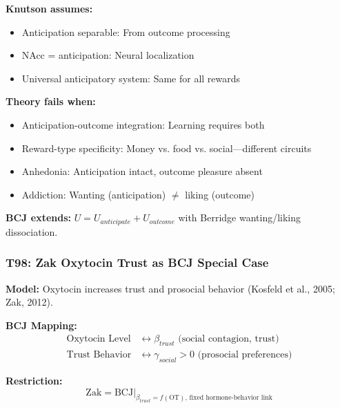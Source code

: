 \begin{tcolorbox}[colback=red!5!white, colframe=red!75!black,
    title=Boundary Condition: Where Knutson Fails]
\textbf{Knutson assumes:}
\begin{itemize}[nosep]
\item Anticipation separable: From outcome processing
\item NAcc = anticipation: Neural localization
\item Universal anticipatory system: Same for all rewards
\end{itemize}

\textbf{Theory fails when:}
\begin{itemize}[nosep]
\item Anticipation-outcome integration: Learning requires both
\item Reward-type specificity: Money vs. food vs. social---different circuits
\item Anhedonia: Anticipation intact, outcome pleasure absent
\item Addiction: Wanting (anticipation) $\neq$ liking (outcome)
\end{itemize}

\textbf{BCJ extends:} $U = U_{anticipate} + U_{outcome}$ with Berridge wanting/liking dissociation.
\end{tcolorbox}

\subsubsection*{T98: Zak Oxytocin Trust as BCJ Special Case}

\textbf{Model:} Oxytocin increases trust and prosocial behavior (Kosfeld et al., 2005; Zak, 2012).

\textbf{BCJ Mapping:}
\begin{align}
\text{Oxytocin Level} &\leftrightarrow \beta_{trust} \text{ (social contagion, trust)} \\
\text{Trust Behavior} &\leftrightarrow \gamma_{social} > 0 \text{ (prosocial preferences)}
\end{align}

\textbf{Restriction:}
\begin{equation}
\text{Zak} = \text{BCJ} \big|_{\beta_{trust} = f(\text{OT}), \, \text{fixed hormone-behavior link}}
\end{equation}

